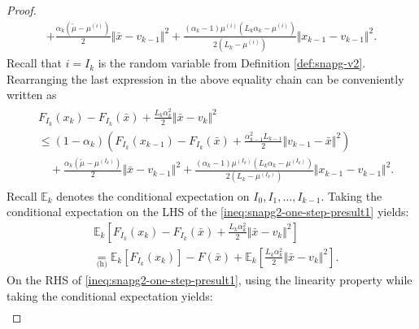 \documentclass[12pt]{article}
\begin{document}
\begin{proof}
{\begin{align*}
                    + \frac{\alpha_k(\tilde\mu - \mu^{(i)})}{2}\Vert \bar x - v_{k - 1}\Vert^2
                    + \frac{(\alpha_k - 1)\mu^{(i)}\left(L_k\alpha_k - \mu^{(i)}\right)}{2\left(L_k - \mu^{(i)}\right)}\Vert x_{k - 1} - v_{k - 1} \Vert^2. 
            \end{align*}
            }
            Recall that $i = I_k$ is the random variable from Definition \ref{def:snapg-v2}. 
            Rearranging the last expression in the above equality chain can be conveniently written as
            \begin{align}
                \begin{split}
                    & F_{I_k}(x_{k}) - F_{I_k}(\bar x) + \frac{L_k\alpha_k^2}{2}\Vert \bar x - v_k\Vert^2 
                    \\ &\le 
                    (1 - \alpha_k)\left(
                        F_{I_k}(x_{k - 1}) - F_{I_k}(\bar x) + \frac{\alpha_{k - 1}^2L_{k - 1}}{2}\Vert v_{k - 1} - \bar x\Vert^2
                    \right) 
                        \\ &\quad 
                        + \frac{\alpha_k(\tilde \mu - \mu^{(I_k)})}{2} \Vert \bar x - v_{k - 1}\Vert^2
                        + \frac{(\alpha_k - 1)\mu^{(I_k)}\left(L_k\alpha_k - \mu^{(I_k)}\right)}{2\left(L_k - \mu^{(I_k)}\right)}\Vert x_{k - 1} - v_{k - 1} \Vert^2. 
                \end{split}
            \label{ineq:snapg2-one-step-presult1}\end{align}
            Recall $\mathbb E_k$ denotes the conditional expectation on $I_0, I_1, \ldots, I_{k - 1}$. 
            Taking the conditional expectation on the LHS of the \eqref{ineq:snapg2-one-step-presult1} yields: 
            \begin{align*}
                & \mathbb E_k\left[
                    F_{I_k}(x_{k}) - F_{I_k}(\bar x) + \frac{L_k\alpha_k^2}{2}\Vert \bar x - v_k\Vert^2 
                \right]
                \\
                &\underset{\text{(h)}}{=}
                \mathbb E_k\left[F_{I_k}(x_{k})\right] 
                - F(\bar x) 
                + \mathbb E_k\left[
                    \frac{L_k\alpha_k^2}{2}\Vert \bar x - v_k\Vert^2 
                \right]. 
            \end{align*}
            On the RHS of \eqref{ineq:snapg2-one-step-presult1}, using the linearity property while taking the conditional expectation yields: 
            {\allowdisplaybreaks
            \begin{align*}

\end{align*}}
\end{proof}
\end{document}
